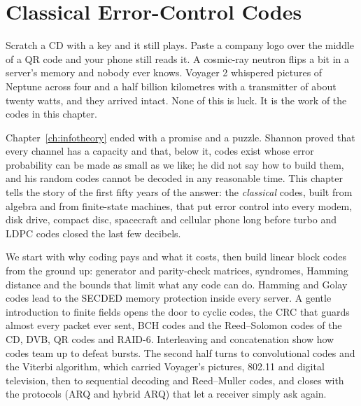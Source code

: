 \chapter{Classical Error-Control Codes}
\label{ch:classiccodes}

\begin{chapterintro}
Scratch a CD with a key and it still plays. Paste a company logo over the middle of a QR code and
your phone still reads it. A cosmic-ray neutron flips a bit in a server's memory and nobody ever
knows. Voyager 2 whispered pictures of Neptune across four and a half billion kilometres with a
transmitter of about twenty watts, and they arrived intact. None of this is luck. It is the work of
the codes in this chapter.

Chapter~\ref{ch:infotheory} ended with a promise and a puzzle. Shannon proved that every channel
has a capacity and that, below it, codes exist whose error probability can be made as small as we
like; he did not say how to build them, and his random codes cannot be decoded in any reasonable
time. This chapter tells the story of the first fifty years of the answer: the \emph{classical}
codes, built from algebra and from finite-state machines, that put error control into every modem,
disk drive, compact disc, spacecraft and cellular phone long before turbo and LDPC codes closed
the last few decibels.

We start with why coding pays and what it costs, then build linear block codes from the ground up:
generator and parity-check matrices, syndromes, Hamming distance and the bounds that limit what any
code can do. Hamming and Golay codes lead to the SECDED memory protection inside every server. A
gentle introduction to finite fields opens the door to cyclic codes, the CRC that guards almost
every packet ever sent, BCH codes and the Reed--Solomon codes of the CD, DVB, QR codes and RAID-6.
Interleaving and concatenation show how codes team up to defeat bursts. The second half turns to
convolutional codes and the Viterbi algorithm, which carried Voyager's pictures, 802.11 and digital
television, then to sequential decoding and Reed--Muller codes, and closes with the protocols (ARQ
and hybrid ARQ) that let a receiver simply ask again.
\end{chapterintro}



